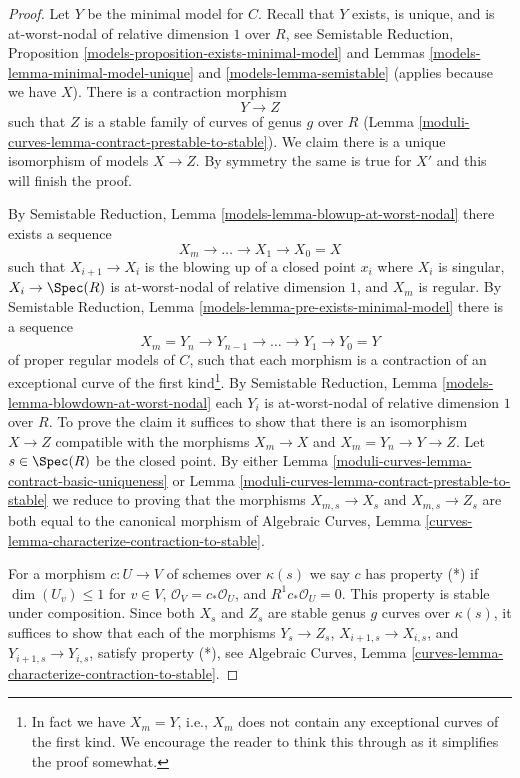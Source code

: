 \begin{proof}
Let $Y$ be the minimal model for $C$. Recall that $Y$ exists, is
unique, and is at-worst-nodal of relative dimension $1$ over $R$, see
Semistable Reduction,
Proposition \ref{models-proposition-exists-minimal-model} and
Lemmas \ref{models-lemma-minimal-model-unique} and
\ref{models-lemma-semistable} (applies because we have $X$).
There is a contraction morphism
$$
Y \longrightarrow Z
$$
such that $Z$ is a stable family of curves of genus $g$ over $R$
(Lemma \ref{moduli-curves-lemma-contract-prestable-to-stable}). We claim
there is a unique isomorphism of models $X \to Z$.
By symmetry the same is true for $X'$ and this will finish the proof.

\medskip\noindent
By Semistable Reduction, Lemma \ref{models-lemma-blowup-at-worst-nodal}
there exists a sequence
$$
X_m \to \ldots \to X_1 \to X_0 = X
$$
such that $X_{i + 1} \to X_i$ is the blowing up of a closed point
$x_i$ where $X_i$ is singular, $X_i \to \Spec(R)$ is at-worst-nodal
of relative dimension $1$, and $X_m$ is regular.
By Semistable Reduction, Lemma \ref{models-lemma-pre-exists-minimal-model}
there is a sequence
$$
X_m = Y_n \to Y_{n - 1} \to \ldots \to Y_1 \to Y_0 = Y
$$
of proper regular models of $C$, such that each morphism is a
contraction of an exceptional curve of the first kind\footnote{In fact
we have $X_m = Y$, i.e., $X_m$ does not contain any exceptional curves
of the first kind. We encourage the reader to think this through
as it simplifies the proof somewhat.}.
By Semistable Reduction, Lemma \ref{models-lemma-blowdown-at-worst-nodal}
each $Y_i$ is at-worst-nodal of relative dimension $1$ over $R$.
To prove the claim it suffices to show that there is an isomorphism
$X \to Z$ compatible with the morphisms $X_m \to X$
and $X_m = Y_n \to Y \to Z$. Let $s \in \Spec(R)$ be the closed point.
By either
Lemma \ref{moduli-curves-lemma-contract-basic-uniqueness} or
Lemma \ref{moduli-curves-lemma-contract-prestable-to-stable}
we reduce to proving that the morphisms
$X_{m, s} \to X_s$ and
$X_{m, s} \to Z_s$
are both equal to the canonical morphism of
Algebraic Curves, Lemma \ref{curves-lemma-characterize-contraction-to-stable}.

\medskip\noindent
For a morphism $c : U \to V$ of schemes over $\kappa(s)$
we say $c$ has property (*) if $\dim(U_v) \leq 1$ for $v \in V$,
$\mathcal{O}_V = c_*\mathcal{O}_U$, and $R^1c_*\mathcal{O}_U = 0$.
This property is stable under composition.
Since both $X_s$ and $Z_s$ are stable genus $g$ curves over $\kappa(s)$,
it suffices to show that each of the morphisms $Y_s \to Z_s$,
$X_{i + 1, s} \to X_{i, s}$, and $Y_{i + 1, s} \to Y_{i, s}$,
satisfy property (*), see
Algebraic Curves, Lemma \ref{curves-lemma-characterize-contraction-to-stable}.


\end{proof}
